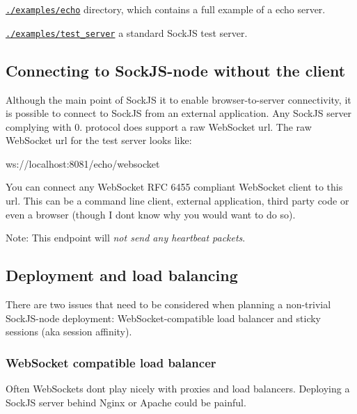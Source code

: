 \begin{DoxyItemize}
\item \href{https://github.com/sockjs/sockjs-node/tree/master/examples/echo}{\tt ./examples/echo} directory, which contains a full example of a echo server.
\item \href{https://github.com/sockjs/sockjs-node/tree/master/examples/test_server}{\tt ./examples/test\+\_\+server} a standard Sock\+JS test server.
\end{DoxyItemize}

\subsection*{Connecting to Sock\+J\+S-\/node without the client }

Although the main point of Sock\+JS it to enable browser-\/to-\/server connectivity, it is possible to connect to Sock\+JS from an external application. Any Sock\+JS server complying with 0. protocol does support a raw Web\+Socket url. The raw Web\+Socket url for the test server looks like\+:


\begin{DoxyItemize}
\item ws\+://localhost\+:8081/echo/websocket
\end{DoxyItemize}

You can connect any Web\+Socket R\+FC 6455 compliant Web\+Socket client to this url. This can be a command line client, external application, third party code or even a browser (though I don\textquotesingle{}t know why you would want to do so).

Note\+: This endpoint will {\itshape not send any heartbeat packets}.

\subsection*{Deployment and load balancing }

There are two issues that need to be considered when planning a non-\/trivial Sock\+J\+S-\/node deployment\+: Web\+Socket-\/compatible load balancer and sticky sessions (aka session affinity).

\subsubsection*{Web\+Socket compatible load balancer}

Often Web\+Sockets don\textquotesingle{}t play nicely with proxies and load balancers. Deploying a Sock\+JS server behind Nginx or Apache could be painful.

